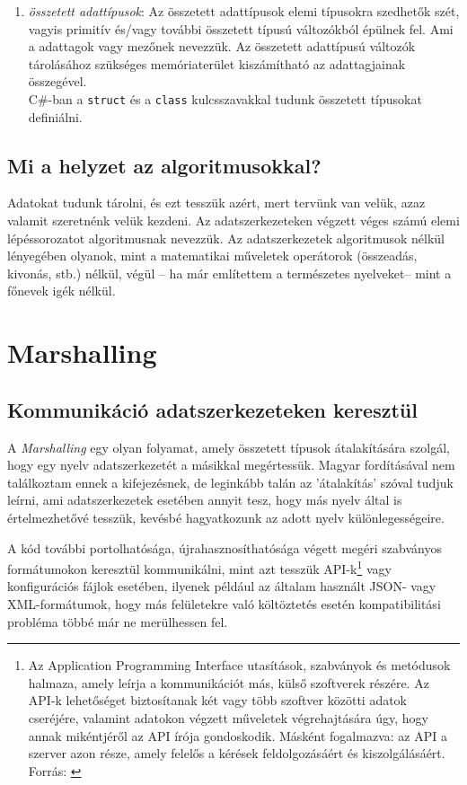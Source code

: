 \documentclass[tocnopagenum]{thesis-ekf}
\theoremstyle{definition}
\theoremstyle{remark}
\begin{document}
\begin{enumerate}[label=\alph*)]
\begin{enumerate}
\begin{tabular}{cc}
			\end{tabular}
		\end{enumerate}
		\item \emph{összetett adattípusok}: Az összetett adattípusok elemi típusokra szedhetők szét, vagyis primitív és/vagy további összetett típusú változókból épülnek fel. Ami a adattagok vagy mezőnek nevezzük. Az összetett adattípusú változók tárolásához szükséges memóriaterület kiszámítható az adattagjainak összegével.\\
		C\#-ban a \verb*|struct| és a \verb*|class| kulcsszavakkal tudunk összetett típusokat definiálni.
	\end{enumerate}
	\section{Mi a helyzet az algoritmusokkal?}
	Adatokat tudunk tárolni, és ezt tesszük azért, mert tervünk van velük, azaz valamit szeretnénk velük kezdeni. Az adatszerkezeteken végzett véges számú elemi lépéssorozatot algoritmusnak nevezzük. Az adatszerkezetek algoritmusok nélkül lényegében olyanok, mint a matematikai műveletek operátorok (összeadás, kivonás, stb.) nélkül, végül -- ha már említettem a természetes nyelveket-- mint a főnevek igék nélkül.

	
	\chapter{Marshalling}
	\section{Kommunikáció adatszerkezeteken keresztül}
	A \emph{Marshalling} egy olyan folyamat, amely összetett típusok átalakítására szolgál, hogy egy nyelv adatszerkezetét a másikkal megértessük. Magyar fordításával nem találkoztam ennek a kifejezésnek, de leginkább talán az 'átalakítás' szóval tudjuk leírni, ami adatszerkezetek esetében annyit tesz, hogy más nyelv által is értelmezhetővé tesszük, kevésbé hagyatkozunk az adott nyelv különlegességeire.\cite{wiki_marshalling}
	\par
	A kód további portolhatósága, újrahasznosíthatósága végett megéri szabványos formátumokon keresztül kommunikálni, mint azt tesszük API-k\footnote{Az Application Programming Interface utasítások, szabványok és metódusok halmaza, amely leírja a kommunikációt más, külső szoftverek részére. Az API-k lehetőséget biztosítanak két vagy több szoftver közötti adatok cseréjére, valamint adatokon végzett műveletek végrehajtására úgy, hogy annak mikéntjéről az API írója gondoskodik. Másként fogalmazva: az API a szerver azon része, amely felelős a kérések feldolgozásáért és kiszolgálásáért. Forrás: \cite{api}} vagy konfigurációs fájlok esetében, ilyenek például az általam használt JSON- vagy XML-formátumok,  hogy más felületekre való költöztetés esetén kompatibilitási probléma többé már ne merülhessen fel.
\end{document}
